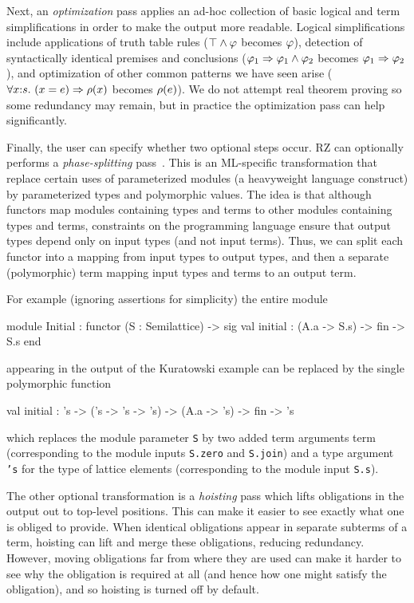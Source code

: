 Next, an \emph{optimization} pass applies an ad-hoc collection of
basic logical and term simplifications in order to make the output more readable. 
Logical simplifications include applications of truth table rules
($\top\land \varphi$ becomes $\varphi$), detection of syntactically
identical premises and conclusions
($\varphi_1\Rightarrow \varphi_1\land \varphi_2$ becomes
$\varphi_1\Rightarrow \varphi_2$), and optimization of other common patterns we have
seen arise
($\forall x{:}s.\ (x = e)\Rightarrow \rho(x)$ becomes
$\rho(e)$). We do not attempt real theorem proving 
so some redundancy may remain, but in practice the optimization pass
can help significantly.

Finally, the user can specify whether two optional steps occur.
RZ can optionally performs a \emph{phase-splitting} pass~\cite{harper+:popl90}. 
This is an ML-specific transformation that replace certain
uses of parameterized modules (a heavyweight language construct) by
parameterized types and polymorphic values. The idea is that although
functors map modules containing types and terms to other modules containing types
and terms, constraints on the programming language ensure that output types
depend only on input types (and not input terms).  Thus, we can split each
functor into a mapping from input types to output types, and then a separate
(polymorphic) term mapping input types and terms to an output term.

For example (ignoring
assertions for simplicity) the entire module
\begin{source}
module Initial : functor (S : Semilattice) ->
                    sig
                      val initial : (A.a -> S.s) -> fin -> S.s
                    end	
\end{source}   
appearing in the output of the Kuratowski example can be replaced by the single polymorphic function
\begin{source}
val initial : 's -> ('s -> 's -> 's) -> (A.a -> 's) -> fin -> 's	
\end{source}
which replaces the module parameter \texttt{S} by two added term arguments term (corresponding to the module inputs \texttt{S.zero} and \texttt{S.join}) 
and a type argument \texttt{'s} for the type of lattice elements (corresponding to the module input \texttt{S.s}).

The other optional transformation is a \emph{hoisting} pass which lifts obligations in the output out to top-level positions.  This can make it easier to see exactly what one is obliged to provide.  When identical obligations appear in separate subterms of a term, hoisting can lift and merge these obligations, reducing redundancy.  However, moving obligations far from where they are used can make it harder to see why the obligation is required at all (and hence how one might satisfy the obligation), and so hoisting is turned off by default.



\label{sec:typechecking}



